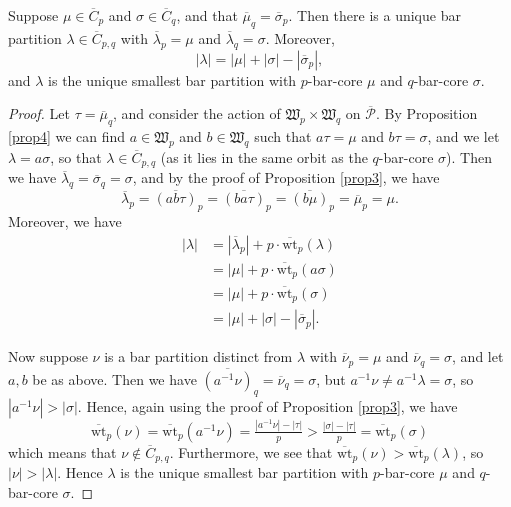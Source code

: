 \documentclass[ALCO, Unicode,published]{cedram}
\begin{document}
\begin{prop}\label{prop5}
Suppose $\mu\in\overline{C}_p$ and $\sigma\in\overline{C}_q$, and that $\overline{\mu}_q=\overline{\sigma}_p$. Then there is a unique bar partition $\lambda\in\overline{C}_{p,q}$ with $\overline{\lambda}_p=\mu$ and $\overline{\lambda}_q=\sigma$. Moreover, 
$$|\lambda|=|\mu|+|\sigma|-|\overline{\sigma}_p|,$$ 
and $\lambda$ is the unique smallest bar partition with $p$-bar-core $\mu$ and $q$-bar-core $\sigma$.
\end{prop}
\begin{proof}
Let $\tau=\overline{\mu}_q$, and consider the action of $\mathfrak{W}_p\times\mathfrak{W}_q$ on $\overline{\mathcal{P}}$. By Proposition \ref{prop4} we can find $a\in\mathfrak{W}_p$ and $b\in\mathfrak{W}_q$ such that $a\tau=\mu$ and $b\tau=\sigma$, and we let $\lambda=a\sigma$, so that $\lambda\in\overline{C}_{p,q}$ (as it lies in the same orbit as the $q$-bar-core $\sigma$). Then we have $\overline{\lambda}_q=\overline{\sigma}_q=\sigma$, and by the proof of Proposition \ref{prop3}, we have 
$$\overline{\lambda}_p=\overline{(ab\tau)}_p=\overline{(ba\tau)}_p=\overline{(b\mu)}_p=\overline{\mu}_p=\mu.$$ 
Moreover, we have 
\begin{align*}
|\lambda|&=|\overline{\lambda}_p|+p\cdot\overline{\text{wt}}_p(\lambda)\\
&=|\mu|+p\cdot\overline{\text{wt}}_p(a\sigma)\\
&=|\mu|+p\cdot\overline{\text{wt}}_p(\sigma)\\
&=|\mu|+|\sigma|-|\overline{\sigma}_p|.\end{align*} 

Now suppose $\nu$ is a bar partition distinct from $\lambda$ with $\overline{\nu}_p=\mu$ and $\overline{\nu}_q=\sigma$, and let $a,b$ be as above. Then we have $\overline{(a^{-1}\nu)}_q=\overline{\nu}_q=\sigma$, but $a^{-1}\nu\neq a^{-1}\lambda=\sigma$, so $|a^{-1}\nu|>|\sigma|$. Hence, again using the proof of Proposition \ref{prop3}, we have  
$$\overline{\text{wt}}_p(\nu)=\overline{\text{wt}}_p(a^{-1}\nu)=\tfrac{|a^{-1}\nu|-|\tau|}{p}>\tfrac{|\sigma|-|\tau|}{p}=\overline{\text{wt}}_p(\sigma)$$ 
which means that $\nu\not\in\overline{C}_{p,q}$. Furthermore, we see that $\overline{\text{wt}}_p(\nu)>\overline{\text{wt}}_p(\lambda)$, so $|\nu|>|\lambda|$. Hence $\lambda$ is the unique smallest bar partition with $p$-bar-core $\mu$ and $q$-bar-core $\sigma$.
\end{proof}
\end{document}
